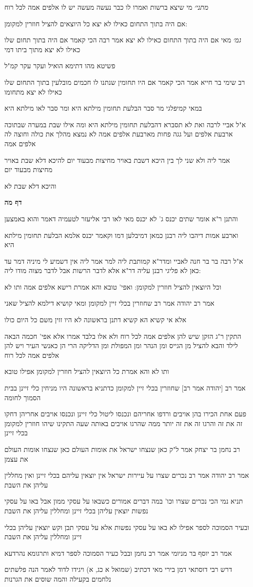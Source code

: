 \documentclass[12pt, openany]{book}
\newcommand{\sethebfont}{
\fontsize{10.5pt}{21.0pt} \selectfont
}
\newcommand{\textblock}[1]{
{\sethebfont #1\\}	
}
\newcommand{\sectname}{}
\newcommand{\newsection}[1]{
	\addcontentsline{toc}{section}{#1}
	\renewcommand{\sectname}{#1}	
	\vspace{-\baselineskip}
	\begin{center}
		\textbf{%
\fontsize{16pt}{16pt}\selectfont
			#1}
	\end{center}
	\vspace{-\baselineskip}
	\nopagebreak
}
\begin{document}
\textblock{{\large\emph{מתני׳}} מי שיצא ברשות ואמרו לו כבר נעשה מעשה יש לו אלפים אמה לכל רוח}
\textblock{אם היה בתוך התחום כאילו לא יצא כל היוצאים להציל חוזרין למקומן:}
\textblock{{\large\emph{גמ׳}} מאי אם היה בתוך התחום כאילו לא יצא אמר רבה הכי קאמר אם היה בתוך תחום שלו כאילו לא יצא מתוך ביתו דמי}
\textblock{פשיטא מהו דתימא הואיל ועקר עקר קמ"ל}
\textblock{רב שימי בר חייא אמר הכי קאמר אם היו תחומין שנתנו לו חכמים מובלעין בתוך התחום שלו כאילו לא יצא מתחומו}
\textblock{במאי קמיפלגי מר סבר הבלעת תחומין מילתא היא ומר סבר לאו מילתא היא}
\textblock{א"ל אביי לרבה ואת לא תסברא דהבלעת תחומין מילתא היא ומה אילו שבת במערה שבתוכה ארבעת אלפים ועל גגה פחות מארבעת אלפים אמה לא נמצא מהלך את כולה וחוצה לה אלפים אמה}
\textblock{אמר ליה ולא שני לך בין היכא דשבת באויר מחיצות מבעוד יום להיכא דלא שבת באויר מחיצות מבעוד יום}
\textblock{והיכא דלא שבת לא}
\newsection{דף מה}
\textblock{והתנן ר"א אומר שתים יכנס ג' לא יכנס מאי לאו רבי אליעזר לטעמיה דאמר והוא באמצען}
\textblock{וארבע אמות דיהבו ליה רבנן כמאן דמיבלען דמו וקאמר יכנס אלמא הבלעת תחומין מילתא היא}
\textblock{א"ל רבה בר בר חנה לאביי ומדר"א קמותבת ליה למר אמר ליה אין דשמיע לי מיניה דמר עד כאן לא פליגי רבנן עליה דר"א אלא לדבר הרשות אבל לדבר מצוה מודו ליה:}
\textblock{וכל היוצאין להציל חוזרין למקומן: ואפי' טובא והא אמרת רישא אלפים אמה ותו לא}
\textblock{אמר רב יהודה אמר רב שחוזרין בכלי זיין למקומן ומאי קושיא דילמא להציל שאני}
\textblock{אלא אי קשיא הא קשיא דתנן בראשונה לא היו זזין משם כל היום כולו}
\textblock{התקין ר"ג הזקן שיש להן אלפים אמה לכל רוח ולא אלו בלבד אמרו אלא אפי' חכמה הבאה לילד והבא להציל מן הגייס ומן הנהר ומן המפולת ומן הדליקה הרי הן כאנשי העיר ויש להן אלפים אמה לכל רוח}
\textblock{ותו לא והא אמרת כל היוצאין להציל חוזרין למקומן אפילו טובא}
\textblock{אמר רב [יהודה אמר רב] שחוזרין בכלי זיין למקומן כדתניא בראשונה היו מניחין כלי זיינן בבית הסמוך לחומה}
\textblock{פעם אחת הכירו בהן אויבים ורדפו אחריהם ונכנסו ליטול כלי זיינן ונכנסו אויבים אחריהן דחקו זה את זה והרגו זה את זה יותר ממה שהרגו אויבים באותה שעה התקינו שיהו חוזרין למקומן בכלי זיינן}
\textblock{רב נחמן בר יצחק אמר ל"ק כאן שנצחו ישראל את אומות העולם כאן שנצחו אומות העולם את עצמן}
\textblock{אמר רב יהודה אמר רב נכרים שצרו על עיירות ישראל אין יוצאין עליהם בכלי זיינן ואין מחללין עליהן את השבת}
\textblock{תניא נמי הכי נכרים שצרו וכו' במה דברים אמורים כשבאו על עסקי ממון אבל באו על עסקי נפשות יוצאין עליהן בכלי זיינן ומחללין עליהן את השבת}
\textblock{ובעיר הסמוכה לספר אפילו לא באו על עסקי נפשות אלא על עסקי תבן וקש יוצאין עליהן בכלי זיינן ומחללין עליהן את השבת}
\textblock{אמר רב יוסף בר מניומי אמר רב נחמן ובבל כעיר הסמוכה לספר דמיא ותרגומא נהרדעא}
\textblock{דרש רבי דוסתאי דמן בירי מאי דכתיב (שמואל א כג, א) ויגידו לדוד לאמר הנה פלשתים נלחמים בקעילה והמה שוסים את הגרנות}
\end{document}
